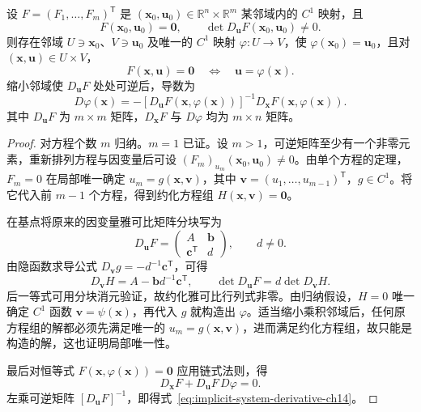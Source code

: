 \documentclass[UTF8,12pt,a4paper,fontset=fandol]{ctexbook}
\begin{document}
\begin{theorem}[隐函数组存在定理]
\label{thm:implicit-function-system-ch14}
设 $F=(F_1,\ldots,F_m)^{\mathsf T}$ 是 $(\boldsymbol x_0,\boldsymbol u_0)\in\mathbb R^n\times\mathbb R^m$ 某邻域内的 $C^1$ 映射，且
\[
    F(\boldsymbol x_0,\boldsymbol u_0)=\boldsymbol0,\qquad
    \det D_{\boldsymbol u}F(\boldsymbol x_0,\boldsymbol u_0)\ne0.
\]
则存在邻域 $U\ni\boldsymbol x_0$、$V\ni\boldsymbol u_0$ 及唯一的 $C^1$ 映射 $\varphi:U\to V$，使 $\varphi(\boldsymbol x_0)=\boldsymbol u_0$，且对 $(\boldsymbol x,\boldsymbol u)\in U\times V$，
\[
    F(\boldsymbol x,\boldsymbol u)=\boldsymbol0
       \quad\Longleftrightarrow\quad\boldsymbol u=\varphi(\boldsymbol x).
\]
缩小邻域使 $D_{\boldsymbol u}F$ 处处可逆后，导数为
\begin{equation}
\label{eq:implicit-system-derivative-ch14}
    D\varphi(\boldsymbol x)
    =-[D_{\boldsymbol u}F(\boldsymbol x,\varphi(\boldsymbol x))]^{-1}
       D_{\boldsymbol x}F(\boldsymbol x,\varphi(\boldsymbol x)).
\end{equation}
其中 $D_{\boldsymbol u}F$ 为 $m\times m$ 矩阵，$D_{\boldsymbol x}F$ 与 $D\varphi$ 均为 $m\times n$ 矩阵。
\end{theorem}
\begin{proof}
对方程个数 $m$ 归纳。$m=1$ 已证。设 $m>1$，可逆矩阵至少有一个非零元素，重新排列方程与因变量后可设 $(F_m)_{u_m}(\boldsymbol x_0,\boldsymbol u_0)\ne0$。由单个方程的定理，$F_m=0$ 在局部唯一确定
$u_m=g(\boldsymbol x,\boldsymbol v)$，其中 $\boldsymbol v=(u_1,\ldots,u_{m-1})^{\mathsf T}$，$g\in C^1$。将它代入前 $m-1$ 个方程，得到约化方程组 $H(\boldsymbol x,\boldsymbol v)=\boldsymbol0$。

在基点将原来的因变量雅可比矩阵分块写为
\[
    D_{\boldsymbol u}F=
    \begin{pmatrix}A&\boldsymbol b\\\boldsymbol c^{\mathsf T}&d\end{pmatrix},
    \qquad d\ne0.
\]
由隐函数求导公式 $D_{\boldsymbol v}g=-d^{-1}\boldsymbol c^{\mathsf T}$，可得
\[
    D_{\boldsymbol v}H=A-\boldsymbol b d^{-1}\boldsymbol c^{\mathsf T},\qquad
    \det D_{\boldsymbol u}F=d\det D_{\boldsymbol v}H.
\]
后一等式可用分块消元验证，故约化雅可比行列式非零。由归纳假设，$H=0$ 唯一确定 $C^1$ 函数 $\boldsymbol v=\psi(\boldsymbol x)$，再代入 $g$ 就构造出 $\varphi$。适当缩小乘积邻域后，任何原方程组的解都必须先满足唯一的 $u_m=g(\boldsymbol x,\boldsymbol v)$，进而满足约化方程组，故只能是构造的解，这也证明局部唯一性。

最后对恒等式 $F(\boldsymbol x,\varphi(\boldsymbol x))=\boldsymbol0$ 应用链式法则，得
\[
    D_{\boldsymbol x}F+D_{\boldsymbol u}F\,D\varphi=0.
\]
左乘可逆矩阵 $[D_{\boldsymbol u}F]^{-1}$，即得式~\eqref{eq:implicit-system-derivative-ch14}。
\end{proof}
\end{document}
